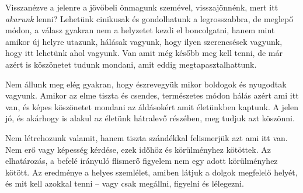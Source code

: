 Visszanézve a jelenre a jövőbeli önmagunk szemével, visszajönnénk, mert
itt \emph{akarunk} lenni? Lehetünk cinikusak és gondolhatunk a
legrosszabbra, de meglepő módon, a válasz gyakran nem a helyzetet kezdi
el boncolgatni, hanem mint amikor új helyre utazunk, hálásak vagyunk,
hogy ilyen szerencsések vagyunk, hogy itt lehetünk ahol vagyunk. Van
amit még később meg kell tenni, de már azért is köszönetet tudunk
mondani, amit eddig megtapasztalhattunk.

Nem állunk meg elég gyakran, hogy észrevegyük mikor boldogok és
nyugodtak vagyunk. Amikor az elme tiszta és csendes, természetes módon
hálás azért ami itt van, és képes köszönetet mondani az áldásokért amit
életünkben kaptunk. A jelen jó, és akárhogy is alakul az életünk
hátralevő részében, meg tudjuk azt köszönni.

Nem létrehozunk valamit, hanem tiszta szándékkal felismerjük azt ami itt
van. Nem erő vagy képesség kérdése, ezek időhöz és körülményhez
kötöttek. Az elhatározás, a befelé irányuló flismerő figyelem nem egy
adott körülményhez kötött. Az eredménye a helyes szemlélet, amiben
látjuk a dolgok megfelelő helyét, és mit kell azokkal tenni -- vagy csak
megállni, figyelni és lélegezni.

